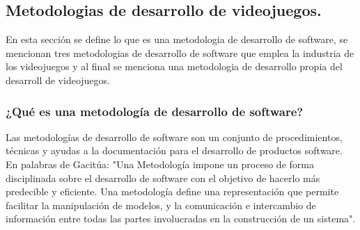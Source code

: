 \subsection{Metodologias de desarrollo de videojuegos.}\label{MetodoVideojuego}
	En esta sección se define lo que es una metodologia de desarrollo de software, se mencionan tres metodologias de desarrollo de software que emplea la industria de los videojuegos y al final se menciona una metodologia de desarrollo propia del desarroll de videojuegos. 	
		 \subsubsection{¿Qué es una metodología de desarrollo de software?}
	Las metodologías de desarrollo de software son un conjunto de procedimientos, técnicas y ayudas a la documentación para el desarrollo de productos software\cite{Ref_metodologia}.	En palabras de Gacitúa: "Una Metodología impone un proceso de forma disciplinada sobre el desarrollo de software con el objetivo de hacerlo más predecible y eficiente. Una metodología define una representación que permite facilitar la manipulación de modelos, y la comunicación e intercambio de información entre todas las partes involucradas en la construcción de un sistema"\cite{Ref_Metod}. 

